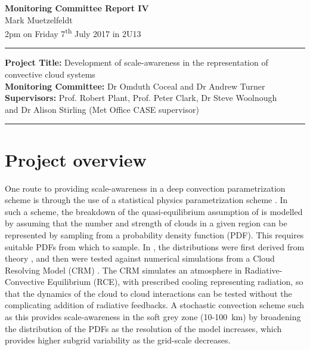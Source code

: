 \documentclass[11pt,a4paper]{article}
\newcommand{\ts}{\textsuperscript}
\begin{document}

\begin{center}
    \Large{\textbf{Monitoring Committee Report IV}}\\[0.1cm]
    \large{Mark Muetzelfeldt}\\
    \normalsize{2pm on Friday 7\ts{th} July 2017 in 2U13}\\[0.1cm]		
    \rule{\textwidth}{0.2mm}
    \textbf{Project Title: }Development of scale-awareness in the representation of
    convective cloud systems\\
    \textbf{Monitoring Committee: }Dr Omduth Coceal and  Dr Andrew Turner\\
    \textbf{Supervisors: }Prof. Robert Plant, Prof. Peter Clark, Dr Steve Woolnough \\
    and Dr Alison Stirling (Met Office CASE supervisor)\\
    \rule{\textwidth}{0.2mm}
\end{center}

\section{Project overview}
\label{sec:Project Overview}

One route to providing scale-awareness in a deep convection parametrization scheme is through the use of a statistical physics parametrization scheme \parencite{plant2008stochastic}. In such a scheme, the breakdown of the quasi-equilibrium assumption of \cite{arakawa1974interaction} is modelled by assuming that the number and strength of clouds in a given region can be represented by sampling from a probability density function (PDF). This requires suitable PDFs from which to sample. In \cite{plant2008stochastic}, the distributions were first derived from theory \parencite{craig2006fluctuations}, and then were tested against numerical simulations from a Cloud Resolving Model (CRM) \parencite[CRM]{cohen2006fluctuations}. The CRM simulates an atmosphere in Radiative-Convective Equilibrium (RCE), with prescribed cooling representing radiation, so that the dynamics of the cloud to cloud interactions can be tested without the complicating addition of radiative feedbacks. A stochastic convection scheme such as this provides scale-awareness in the soft grey zone (\SI{10}{}-\SI{100}{km}) by broadening the distribution of the PDFs as the resolution of the model increases, which provides higher subgrid variability as the grid-scale decreases.
\end{document}
